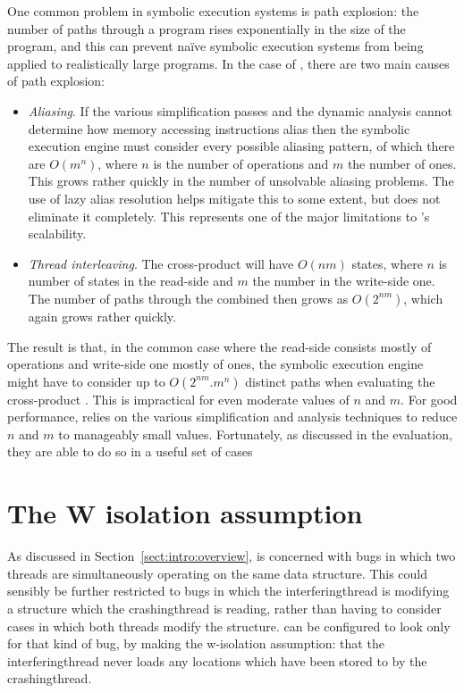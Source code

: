 {One common problem in symbolic execution systems is path explosion:
the number of paths through a program rises exponentially in the size
of the program, and this can prevent na\"ive symbolic execution
systems from being applied to realistically large programs.  In the
case of \technique, there are two main causes of path explosion:
\begin{itemize}
\item
  \textit{Aliasing}.  If the various simplification passes and the
  dynamic analysis cannot determine how memory accessing instructions
  alias then the symbolic execution engine must consider every
  possible aliasing pattern, of which there are $O(m^n)$, where $n$ is
  the number of  operations and $m$ the number of
   ones.  This grows rather quickly in the number of
  unsolvable aliasing problems.  The use of lazy alias resolution
  helps mitigate this to some extent, but does not eliminate it
  completely.  This represents one of the major limitations to
  \technique's scalability.
\item
  \textit{Thread interleaving}.  The cross-product {\StateMachine}
  will have $O(nm)$ states, where $n$ is number of states in the
  read-side {\StateMachine} and $m$ the number in the write-side one.
  The number of paths through the combined {\StateMachine} then grows
  as $O(2^{nm})$, which again grows rather quickly.
\end{itemize}
The result is that, in the common case where the read-side
{\StateMachine} consists mostly of  operations and
write-side one mostly of  ones, the symbolic execution
engine might have to consider up to $O(2^{nm}.m^n)$ distinct paths
when evaluating the cross-product {\StateMachine}.  This is
impractical for even moderate values of $n$ and $m$.  For good
performance, {\technique} relies on the various simplification and
analysis techniques to reduce $n$ and $m$ to manageably small values.
Fortunately, as discussed in the evaluation, they are able to do so in
a useful set of cases

\section{The W isolation assumption}
\label{sect:derive:w_isolation}


As discussed in Section~\ref{sect:intro:overview}, {\technique} is
concerned with bugs in which two threads are simultaneously operating
on the same data structure.  This could sensibly be further restricted
to bugs in which the \gls{interferingthread} is modifying a structure
which the \gls{crashingthread} is reading, rather than having to
consider cases in which both threads modify the structure.
{\Implementation} can be configured to look only for that kind of bug,
by making the \gls{w-isolation} assumption: that the
\gls{interferingthread} never loads any locations which have been
stored to by the \gls{crashingthread}.

}

